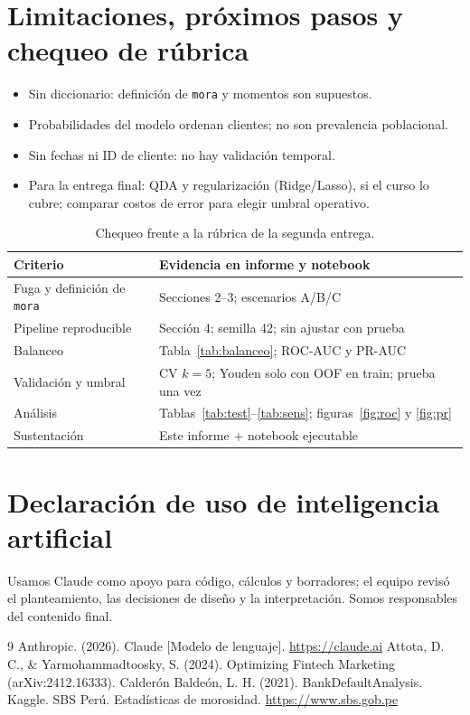 \documentclass[11pt,a4paper]{article}
\begin{document}
\section{Limitaciones, próximos pasos y chequeo de rúbrica}

\begin{itemize}
  \item Sin diccionario: definición de \texttt{mora} y momentos son supuestos.
  \item Probabilidades del modelo ordenan clientes; no son prevalencia poblacional.
  \item Sin fechas ni ID de cliente: no hay validación temporal.
  \item Para la entrega final: QDA y regularización (Ridge/Lasso), si el curso lo cubre; comparar costos de error para elegir umbral operativo.
\end{itemize}

\begin{table}[H]
  \centering
  \caption{Chequeo frente a la rúbrica de la segunda entrega.}
  \label{tab:rubrica}
  \small
  \begin{tabular}{@{}p{3.8cm}p{8.8cm}@{}}
    \toprule
    Criterio & Evidencia en informe y notebook \\
    \midrule
    Fuga y definición de \texttt{mora} & Secciones 2--3; escenarios A/B/C \\
    Pipeline reproducible & Sección 4; semilla 42; sin ajustar con prueba \\
    Balanceo & Tabla~\ref{tab:balanceo}; ROC-AUC y PR-AUC \\
    Validación y umbral & CV $k=5$; Youden solo con OOF en train; prueba una vez \\
    Análisis & Tablas~\ref{tab:test}--\ref{tab:sens}; figuras~\ref{fig:roc} y \ref{fig:pr} \\
    Sustentación & Este informe + notebook ejecutable \\
    \bottomrule
  \end{tabular}
\end{table}

\section*{Declaración de uso de inteligencia artificial}
Usamos Claude como apoyo para código, cálculos y borradores; el equipo revisó el planteamiento, las decisiones de diseño y la interpretación. Somos responsables del contenido final.

\begin{thebibliography}{9}
 Anthropic. (2026). Claude [Modelo de lenguaje]. \url{https://claude.ai}
 Attota, D. C., \& Yarmohammadtoosky, S. (2024). Optimizing Fintech Marketing (arXiv:2412.16333).
 Calderón Baldeón, L. H. (2021). BankDefaultAnalysis. Kaggle.
 SBS Perú. Estadísticas de morosidad. \url{https://www.sbs.gob.pe}
\end{thebibliography}
\end{document}
